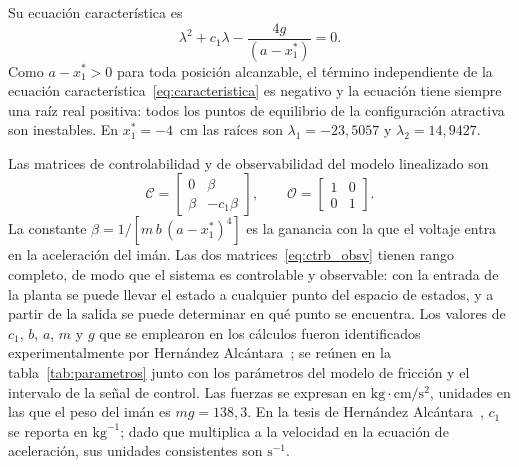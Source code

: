 Su ecuación característica es
\begin{equation}
\lambda^2 + c_1\lambda - \dfrac{4g}{(a-x_1^{\ast})} = 0 .
\label{eq:caracteristica}
\end{equation}
Como $a - x_1^{\ast} > 0$ para toda posición alcanzable, el término independiente de la ecuación característica~\eqref{eq:caracteristica} es negativo y la ecuación tiene siempre una raíz real positiva: todos los puntos de equilibrio de la configuración atractiva son inestables. En $x_1^{\ast}=-4$~cm las raíces son $\lambda_1 = -23{,}5057$ y $\lambda_2 = 14{,}9427$.

Las matrices de controlabilidad y de observabilidad del modelo linealizado son
\begin{equation}
\mathcal{C}
=
\begin{bmatrix}
0 & \beta\\[6pt]
\beta & -c_1 \beta
\end{bmatrix} ,
\qquad
\mathcal{O}
=
\begin{bmatrix}
1 & 0\\[6pt]
0 & 1
\end{bmatrix} .
\label{eq:ctrb_obsv}
\end{equation}
La constante $\beta = 1/[m\,b\,(a-x_1^{\ast})^4]$ es la ganancia con la que el voltaje entra en la aceleración del imán. Las dos matrices~\eqref{eq:ctrb_obsv} tienen rango completo, de modo que el sistema es controlable y observable: con la entrada de la planta se puede llevar el estado a cualquier punto del espacio de estados, y a partir de la salida se puede determinar en qué punto se encuentra.
Los valores de $c_1$, $b$, $a$, $m$ y $g$ que se emplearon en los cálculos fueron identificados experimentalmente por Hernández Alcántara~\cite{diana_tesis}; se reúnen en la tabla~\ref{tab:parametros} junto con los parámetros del modelo de fricción y el intervalo de la señal de control. Las fuerzas se expresan en $\text{kg}\cdot\text{cm}/\text{s}^2$, unidades en las que el peso del imán es $mg = 138{,}3$. En la tesis de Hernández Alcántara~\cite{diana_tesis}, $c_1$ se reporta en $\text{kg}^{-1}$; dado que multiplica a la velocidad en la ecuación de aceleración, sus unidades consistentes son $\text{s}^{-1}$.

